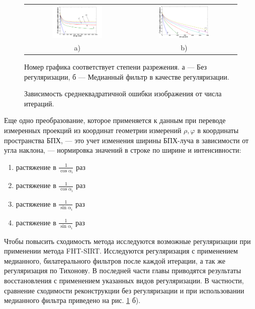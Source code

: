 \begin{figure}
\centering
\begin{tabular}{@{}c@{}c}
    \includegraphics[width=0.50\textwidth]{Dissertation/images/part1_img/raw}
&
    \includegraphics[width=0.50\textwidth]{Dissertation/images/part1_img/medk}
\\
   \small a) & \small b)
\end{tabular}
  \caption{Зависимость среднеквадратичной ошибки изображения от числа итераций.}
Номер графика соответствует степени разрежения. а --- Без регуляризации, б --- Медианный фильтр в качестве регуляризации.
\label{fig:conv_all}
\end{figure}

\vspace{2cm}

Еще одно преобразование, которое применяется к данным при переводе измеренных проекций из координат геометрии измерений $\rho, \varphi$ в координаты пространства БПХ, --- это учет изменения ширины БПХ-луча в зависимости от угла наклона, --- нормировка значений в строке по ширине и интенсивности:
\begin{enumerate}[label=\Roman*.]
	\item растяжение в $\frac 1 {\cos \alpha_i}$ раз
	\item растяжение в $\frac 1 {\cos \alpha_i}$ раз
	\item растяжение в $\frac 1 {\sin \alpha_i}$ раз
	\item растяжение в $\frac 1 {\sin \alpha_i}$ раз
\end{enumerate}

Чтобы повысить сходимость метода исследуются возможные регуляризации при применении метода FHT-SIRT.
Исследуются регуляризация с применением медианного, билатерального фильтров после каждой итерации, а так же регуляризация по Тихонову.
В последней части главы приводятся результаты восстановления с применением указанных видов регуляризации.
В частности, сравнение сходимости реконструкции без регуляризации и при использовании медианного фильтра приведено на рис. \ref{fig:conv_all} б).

